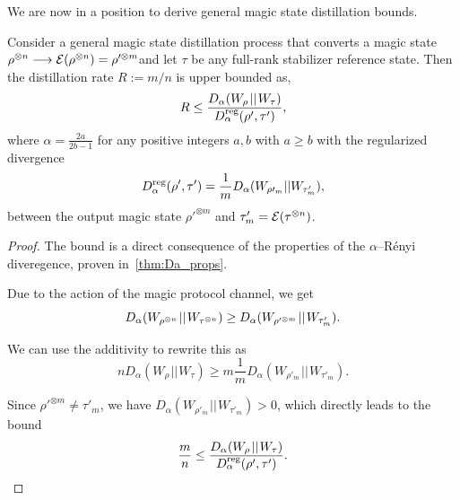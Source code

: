 \documentclass[pra,
aps,
twocolumn,
superscriptaddress,
groupedaddress,
nofootinbib,
reprint
]{revtex4-1}
\begin{document}
We are now in a position to derive general magic state distillation bounds.

\begingroup
\def\thetheorem{\ref{thm:entropic_bounds}}
\begin{theorem}
	Consider a general magic state distillation process that converts a magic state $\rho^{\otimes n} \longrightarrow {\mathcal E}(\rho^{\otimes n})=\rho'^{\otimes m}$and let $\tau$ be any full-rank stabilizer reference state. Then the distillation rate $R := m/n$ is upper bounded as,
	\begin{equation}
		R \leq \frac{D_{\alpha}(W_\rho \hspace{1pt}||\hspace{1pt} W_\tau)}{D^{\rm reg}_\alpha( \rho', \tau')},
	\end{equation}
	where $\alpha = \frac{2a}{2b-1}$ for any positive integers $a,b$ with $a \geq b$ with the regularized divergence
	\begin{equation}
D^{\rm reg}_\alpha( \rho', \tau') = \frac{1}{m} D_\alpha (W_{\rho\prime_m} || W_{\tau'_m}),
\end{equation}
between the output magic state $\rho'^{\otimes m}$ and $\tau'_m = {\mathcal E}(\tau^{\otimes n})$.
\end{theorem}
\addtocounter{theorem}{-1}
\endgroup
\begin{proof}
	The bound is a direct consequence of the properties of the $\alpha$--R\'{e}nyi diveregence, proven in~\cref{thm:Da_props}.
	
Due to the action of the magic protocol channel, we get
\begin{equation}	
	D_\alpha(W_{\rho^{\otimes n}} \hspace{1pt}||\hspace{1pt} W_{\tau^{\otimes n}}) \geq D_\alpha (W_{\rho'^{\otimes m}} \hspace{1pt}||\hspace{1pt} W_{\tau'_m}).\vspace{10pt}
\end{equation}

We can use the additivity to rewrite this as
\begin{equation}
	n D_\alpha(W_\rho \hspace{1pt}||\hspace{1pt} W_\tau) \geq m \frac{1}{m}D_\alpha(W_{\rho'_m} \hspace{1pt}||\hspace{1pt} W_{\tau'_m}).
\end{equation}

Since $\rho'^{\otimes m} \neq \tau'_m$, we have $D_\alpha(W_{\rho'_m} \hspace{1pt}||\hspace{1pt} W_{\tau'_m}) > 0$, which directly leads to the bound
\begin{equation}
	\frac{m}{n} \leq \frac{D_{\alpha}(W_\rho \hspace{1pt}||\hspace{1pt} W_\tau)}{D^{\rm reg}_\alpha( \rho', \tau')}.
\end{equation}
\end{proof}
\end{document}
